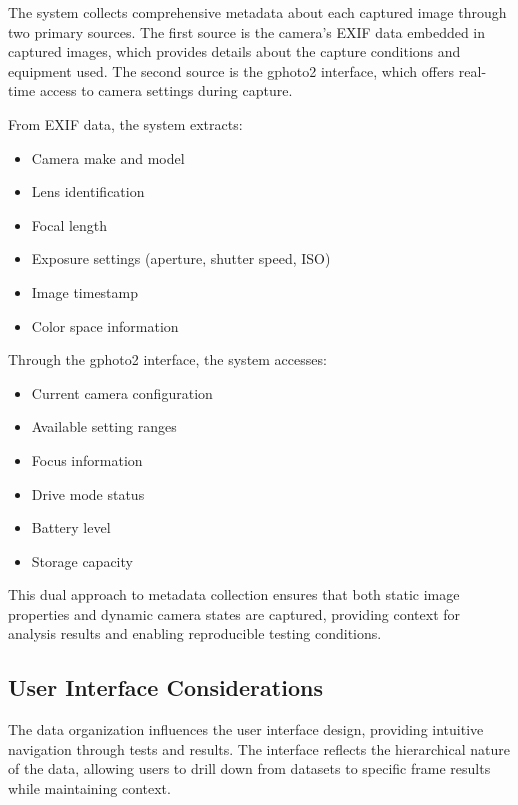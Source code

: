 The system collects comprehensive metadata about each captured image through two primary sources. The first source is the camera's EXIF data embedded in captured images, which provides details about the capture conditions and equipment used. The second source is the gphoto2 interface, which offers real-time access to camera settings during capture.

From EXIF data, the system extracts:
\begin{itemize}
    \item Camera make and model
    \item Lens identification
    \item Focal length
    \item Exposure settings (aperture, shutter speed, ISO)
    \item Image timestamp
    \item Color space information
\end{itemize}

Through the gphoto2 interface, the system accesses:
\begin{itemize}
    \item Current camera configuration
    \item Available setting ranges
    \item Focus information
    \item Drive mode status
    \item Battery level
    \item Storage capacity
\end{itemize}

This dual approach to metadata collection ensures that both static image properties and dynamic camera states are captured, providing context for analysis results and enabling reproducible testing conditions.


\subsection{User Interface Considerations}
The data organization influences the user interface design, providing intuitive navigation through tests and results. The interface reflects the hierarchical nature of the data, allowing users to drill down from datasets to specific frame results while maintaining context.
